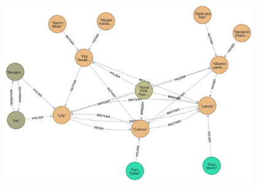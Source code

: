 \documentclass[14pt,a4paper]{extarticle}
\begin{document}
	\begin{center}
		\includegraphics[width=0.8\textwidth]{images/cats.png}
	\end{center}
\end{document}

